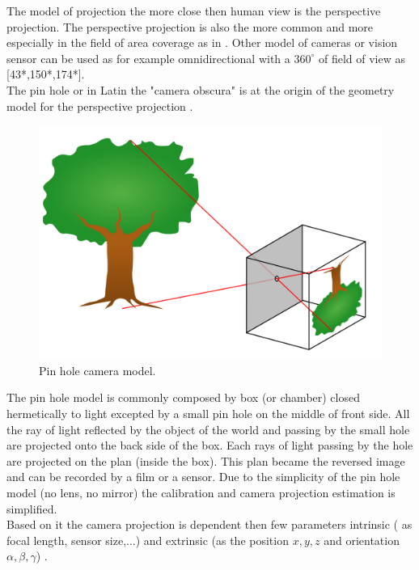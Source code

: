 The model of projection the more close then human view is the perspective projection. The perspective projection is also the more common and more especially in the field of  area coverage as in \cite{101*topcuoglu2009,33*reddy2012,8*zhou2011,82*chrysostomou2012,22*zhao2008}. Other model of cameras or vision sensor can be used as for example omnidirectional  with a $360^{\circ}$ of field of view as [43*,150*,174*].  \\
The pin hole or in Latin the "camera obscura"  is at the origin of the geometry model for the perspective projection .\\
\begin{figure}[t!]
   \includegraphics[width=\linewidth]{img/PinholeCam.png}
  \caption{ Pin hole camera model.}\label{fig:PanTiltRoll}
  \endminipage\hfill
\end{figure} 
 The pin hole model is commonly composed by box (or chamber) closed hermetically to light excepted by a small pin hole on the middle of front side. All the ray of light reflected by the object of the world and passing by the small hole are projected onto the back side of the box. Each rays of light passing by the hole are  projected on the plan (inside the box). This plan became the reversed image and can be recorded by a film or a sensor. 
 Due to the simplicity of the pin hole model (no lens, no mirror) the calibration and camera projection  estimation is simplified.\\
  Based on it the camera projection is dependent then few parameters intrinsic ( as focal length, sensor size,...) and extrinsic (as the position $x,y,z$ and orientation $\alpha,\beta,\gamma$) . 
  
